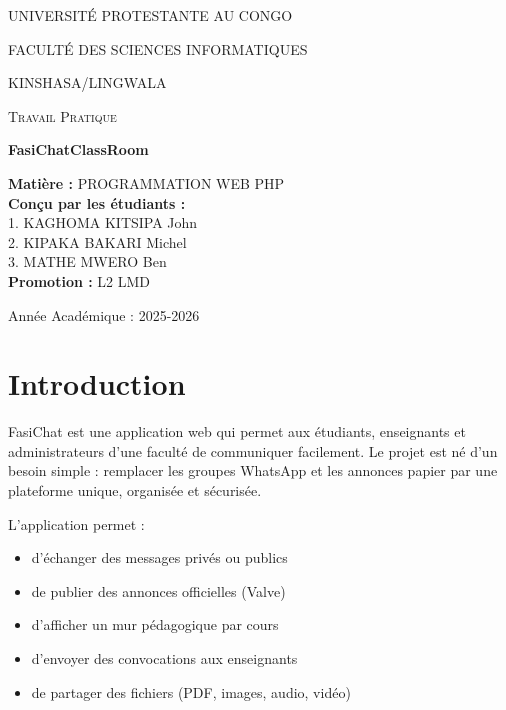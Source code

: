 \documentclass[12pt,a4paper]{article}
\begin{document}
\begin{titlepage}
    \centering
    \vspace*{0.5cm}
    {\scshape\Large UNIVERSIT\'E PROTESTANTE AU CONGO \par}
    {\scshape\large FACULT\'E DES SCIENCES INFORMATIQUES \par}
    {\scshape\large KINSHASA/LINGWALA \par}
    \vspace{2cm}
    \vspace{1cm}
    {\scshape\Large Travail Pratique \par}
    \vspace{1cm}
    {\huge\bfseries FasiChatClassRoom \par}
    \vspace{2cm}

    \begin{flushleft}
    {\Large\bfseries Mati\`ere :} PROGRAMMATION WEB PHP \\
    \vspace{0.8cm}
    {\Large\bfseries Con\c cu par les \'etudiants :} \\
    {\large 1. KAGHOMA KITSIPA John} \\
    {\large 2. KIPAKA BAKARI Michel} \\
    {\large 3. MATHE MWERO Ben} \\
    \vspace{0.8cm}
    {\Large\bfseries Promotion :} L2 LMD \\
    \end{flushleft}

    \vfill
    {\large Ann\'ee Acad\'emique : 2025-2026 \par}
\end{titlepage}

\newpage
\tableofcontents
\newpage

\section{Introduction}

FasiChat est une application web qui permet aux \'etudiants, enseignants et
administrateurs d'une facult\'e de communiquer facilement. Le projet est n\'e
d'un besoin simple : remplacer les groupes WhatsApp et les annonces papier par
une plateforme unique, organis\'ee et s\'ecuris\'ee.

L'application permet :
\begin{itemize}
    \item d'\'echanger des messages priv\'es ou publics
    \item de publier des annonces officielles (Valve)
    \item d'afficher un mur p\'edagogique par cours
    \item d'envoyer des convocations aux enseignants
    \item de partager des fichiers (PDF, images, audio, vid\'eo)
\end{itemize}
\end{document}
